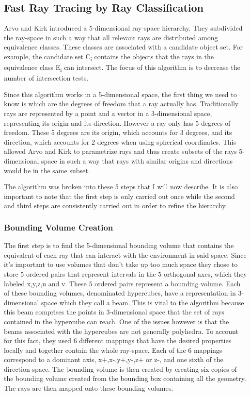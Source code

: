 \documentclass{llncs}
\begin{document}
%
\subsection{Fast Ray Tracing by Ray Classification}
%

Arvo and Kirk \cite{ArvoKirk87} introduced a 5-dimensional ray-space hierarchy. They subdivided the ray-space in such a way that all relevant rays are distributed among equivalence classes. These classes are associated with a candidate object set. For example, the candidate set C\textsubscript{i} contains the objects that the rays in the equivalence class E\textsubscript{i} can intersect. The focus of this algorithm is to decrease the number of intersection tests.

\medskip

Since this algorithm works in a 5-dimensional space, the first thing we need to know is which are the degrees of freedom that a ray actually has. Traditionally rays are represented by a point and a vector in a 3-dimensional space, representing its origin and its direction. However a ray only has 5 degrees of freedom. These 5 degrees are its origin, which accounts for 3 degrees, and its direction, which accounts for 2 degrees when using spherical coordinates. This allowed Arvo and Kirk to parametrize rays and thus create subsets of the rays 5-dimensional space in such a way that rays with similar origins and directions would be in the same subset. 

\medskip

The algorithm was broken into these 5 steps that I will now describe. It is also important to note that the first step is only carried out once while the second and third steps are consistently carried out in order to refine the hierarchy.

\subsubsection{Bounding Volume Creation}

The first step is to find the 5-dimensional bounding volume that contains the equivalent of each ray that can interact with the environment in said space. Since it's important to use volumes that don't take up too much space they chose to store 5 ordered pairs that represent intervals in the 5 orthogonal axes, which they labeled x,y,z,u and v. These 5 ordered pairs represent a bounding volume. Each of these bounding volumes, denominated hypercubes, have a representation in 3-dimensional space which they call a beam. This is vital to the algorithm because this beam comprises the points in 3-dimensional space that the set of rays contained in the hypercube can reach. One of the issues however is that the beams associated with the hypercubes are not generally polyhedra. To account for this fact, they used 6 different mappings that have the desired properties locally and together contain the whole ray-space. Each of the 6 mappings correspond to a dominant axis, x+,x-,y+,y-,z+ or z-, and one sixth of the direction space. The bounding volume is then created by creating six copies of the bounding volume created from the bounding box containing all the geometry. The rays are then mapped onto these bounding volumes.
\end{document}
